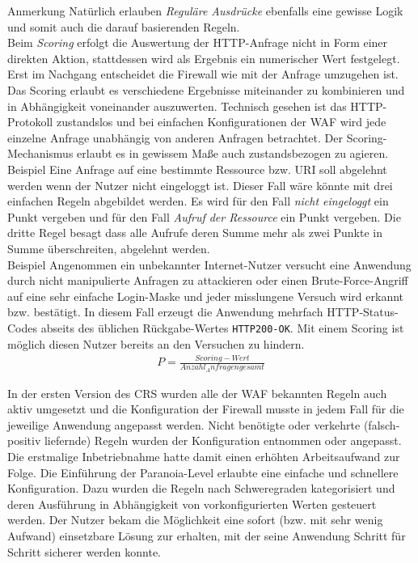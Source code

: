 \textcolor{bhtGray}{ Anmerkung} Natürlich erlauben \emph{Reguläre Ausdrücke} ebenfalls eine gewisse Logik und somit auch die darauf basierenden Regeln.\\

Beim \emph{Scoring} erfolgt die Auswertung der HTTP-Anfrage nicht in Form einer direkten Aktion, stattdessen wird als Ergebnis ein numerischer Wert festgelegt. Erst im Nachgang entscheidet die Firewall wie mit der Anfrage umzugehen ist. Das Scoring erlaubt es verschiedene Ergebnisse miteinander zu kombinieren und in Abhängigkeit voneinander auszuwerten. Technisch gesehen ist das HTTP-Protokoll zustandslos und bei einfachen Konfigurationen der WAF  wird jede einzelne Anfrage unabhängig von anderen Anfragen betrachtet. Der Scoring-Mechanismus erlaubt es in gewissem Maße auch zustandsbezogen zu agieren. \\


\textcolor{bhtGray}{ Beispiel} Eine Anfrage auf eine bestimmte Ressource bzw. URI soll abgelehnt werden wenn der Nutzer nicht eingeloggt ist. Dieser Fall wäre könnte mit drei einfachen Regeln abgebildet werden. Es wird für den Fall \emph{nicht eingeloggt} ein Punkt vergeben und für den Fall \emph{Aufruf der Ressource} ein Punkt vergeben. Die dritte Regel besagt dass alle Aufrufe deren Summe mehr als zwei Punkte in Summe überschreiten, abgelehnt werden.\\

\textcolor{bhtGray}{ Beispiel} Angenommen ein unbekannter Internet-Nutzer versucht eine Anwendung durch nicht manipulierte Anfragen zu attackieren oder einen Brute-Force-Angriff auf eine sehr einfache Login-Maske und jeder misslungene Versuch wird erkannt bzw. bestätigt. In diesem Fall erzeugt die Anwendung mehrfach HTTP-Status-Codes abseits des üblichen Rückgabe-Wertes \verb=HTTP200-OK=. Mit einem Scoring ist möglich diesen Nutzer bereits an den Versuchen zu hindern.
\begin{align}
  P = \frac{Scoring-Wert}{Anzahl_Anfragen gesamt}
\end{align}

In der ersten Version des CRS wurden alle der WAF bekannten Regeln auch aktiv umgesetzt und die Konfiguration der Firewall musste in jedem Fall für die jeweilige Anwendung angepasst werden. Nicht benötigte oder verkehrte (falsch-positiv liefernde) Regeln wurden der Konfiguration entnommen oder angepasst. Die erstmalige Inbetriebnahme hatte damit einen erhöhten Arbeitsaufwand zur Folge. Die Einführung der Paranoia-Level erlaubte eine einfache und schnellere Konfiguration. Dazu wurden die Regeln nach Schweregraden kategorisiert und deren Ausführung in Abhängigkeit von vorkonfigurierten Werten gesteuert werden. Der Nutzer bekam die Möglichkeit eine sofort (bzw. mit sehr wenig Aufwand) einsetzbare Lösung zur erhalten, mit der seine Anwendung Schritt für Schritt sicherer werden konnte.

